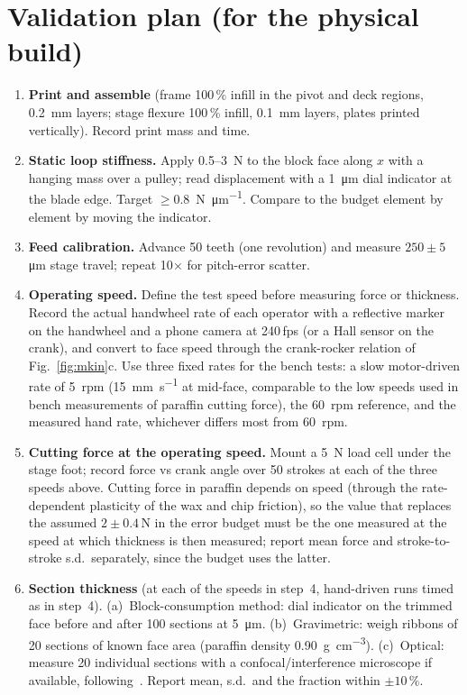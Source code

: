 \documentclass[11pt,a4paper]{article}
\begin{document}
\FloatBarrier
\section{Validation plan (for the physical build)}
\label{sec:validation}
\begin{enumerate}[nosep]
\item \textbf{Print and assemble} (frame 100\,\% infill in the pivot and deck regions, \SI{0.2}{\milli\metre} layers; stage flexure 100\,\% infill, \SI{0.1}{\milli\metre} layers, plates printed vertically). Record print mass and time.
\item \textbf{Static loop stiffness.} Apply 0.5--\SI{3}{\newton} to the block face along $x$ with a hanging mass over a pulley; read displacement with a \SI{1}{\micro\metre} dial indicator at the blade edge. Target $\geq$\SI{0.8}{\newton\per\micro\metre}. Compare to the budget element by element by moving the indicator.
\item \textbf{Feed calibration.} Advance 50 teeth (one revolution) and measure $250\pm5$\,\si{\micro\metre} stage travel; repeat 10$\times$ for pitch-error scatter.
\item \textbf{Operating speed.} Define the test speed before measuring force or thickness. Record the actual handwheel rate of each operator with a reflective marker on the handwheel and a phone camera at 240\,fps (or a Hall sensor on the crank), and convert to face speed through the crank-rocker relation of Fig.~\ref{fig:mkin}c. Use three fixed rates for the bench tests: a slow motor-driven rate of 5~rpm (\SI{15}{\milli\metre\per\second} at mid-face, comparable to the low speeds used in bench measurements of paraffin cutting force), the 60~rpm reference, and the measured hand rate, whichever differs most from 60~rpm.
\item \textbf{Cutting force at the operating speed.} Mount a \SI{5}{\newton} load cell under the stage foot; record force vs crank angle over 50 strokes at each of the three speeds above. Cutting force in paraffin depends on speed (through the rate-dependent plasticity of the wax and chip friction), so the value that replaces the assumed $2\pm0.4$\,\si{\newton} in the error budget must be the one measured at the speed at which thickness is then measured; report mean force and stroke-to-stroke s.d.\ separately, since the budget uses the latter.
\item \textbf{Section thickness} (at each of the speeds in step~4, hand-driven runs timed as in step~4). (a)~Block-consumption method: dial indicator on the trimmed face before and after 100 sections at \SI{5}{\micro\metre}. (b)~Gravimetric: weigh ribbons of 20 sections of known face area (paraffin density \SI{0.90}{\gram\per\centi\metre\cubed}). (c)~Optical: measure 20 individual sections with a confocal/interference microscope if available, following~\citet{Fujisawa2026}. Report mean, s.d.\ and the fraction within $\pm10\,\%$.

\end{enumerate}
\end{document}
